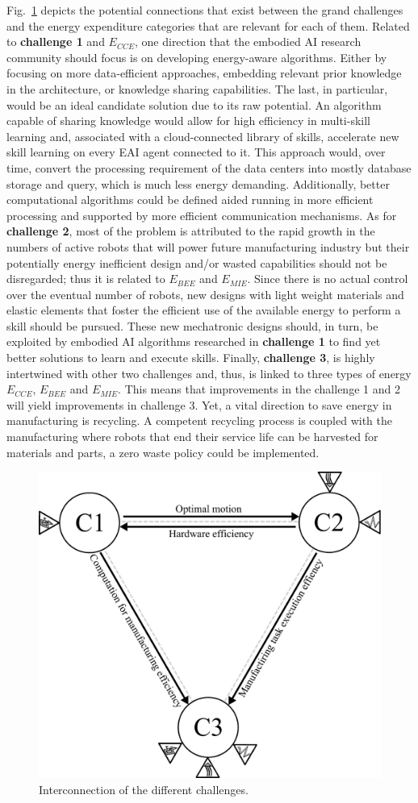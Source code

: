Fig.~\ref{fig:challengesConnected} depicts the potential connections that exist between the grand challenges and the energy expenditure categories that are relevant for each of them. Related to \textbf{challenge 1} and $E_{CCE}$, one direction that the embodied AI research community should focus is on developing energy-aware algorithms. Either by focusing on more data-efficient approaches, embedding relevant prior knowledge in the architecture, or knowledge sharing capabilities. The last, in particular, would be an ideal candidate solution due to its raw potential. An algorithm capable of sharing knowledge would allow for high efficiency in multi-skill learning and, associated with a cloud-connected library of skills, accelerate new skill learning on every EAI agent connected to it. This approach would, over time, convert the processing requirement of the data centers into mostly database storage and query, which is much less energy demanding. Additionally, better computational algorithms could be defined aided running in more efficient processing and supported by more efficient communication mechanisms. As for \textbf{challenge 2}, most of the problem is attributed to the rapid growth in the numbers of active robots that will power future manufacturing industry but their potentially energy inefficient design and/or wasted capabilities should not be disregarded; thus it is related to $E_{BEE}$ and $E_{MIE}$. Since there is no actual control over the eventual number of robots, new designs with light weight materials and elastic elements that foster the efficient use of the available energy to perform a skill should be pursued. These new mechatronic designs should, in turn, be exploited by embodied AI algorithms researched in \textbf{challenge 1} to find yet better solutions to learn and execute skills. Finally, \textbf{challenge 3}, is highly intertwined with other two challenges and, thus, is linked to three types of energy $E_{CCE}$, $E_{BEE}$ and $E_{MIE}$. This means that improvements in the challenge 1 and 2 will yield improvements in challenge 3. Yet, a vital direction to save energy in manufacturing is recycling. A competent recycling process is coupled with the manufacturing where robots that end their service life can be harvested for materials and parts, a zero waste policy could be implemented. 
\begin{figure}[!t]
	\centering
	\includegraphics[width=0.9\columnwidth]{fig/grand_challenges_connections_v2.pdf}
	\caption{Interconnection of the different challenges.}
	\label{fig:challengesConnected}
\end{figure}
